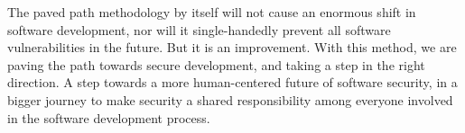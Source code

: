 
The paved path methodology by itself will not cause an enormous shift in software development, nor will it single-handedly prevent all software vulnerabilities in the future.
But it is an improvement.
With this method, we are paving the path towards secure development, and taking a step in the right direction.
A step towards a more human-centered future of software security, in a bigger journey to make security a shared responsibility among everyone involved in the software development process.